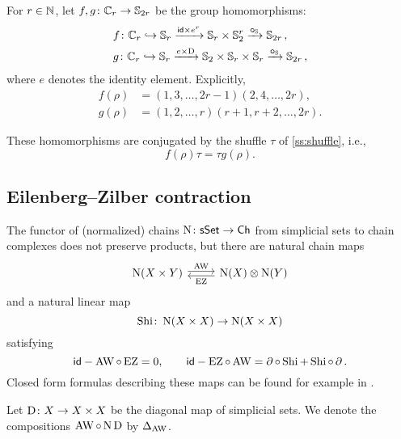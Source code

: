 For $r \in \mathbb{N}$, let $f,g \colon \mathbb{C}_r \to \mathbb{S}_{2r}$ be the group homomorphisms:
\[
\begin{split}
	&f \colon \mathbb{C}_r \hookrightarrow \mathbb{S}_r \xrightarrow{\mathsf{id} \times e^r} \mathbb{S}_r \times \mathbb{S}_2^r \xrightarrow{\bm{\circ}_{\mathbb{S}}} \mathbb{S}_{2r}\,, \\
	&g \colon \mathbb{C}_r \hookrightarrow \mathbb{S}_r \xrightarrow{e \times \mathrm{D}} \mathbb{S}_2 \times \mathbb{S}_r \times \mathbb{S}_r \xrightarrow{\bm{\circ}_{\mathbb{S}}} \mathbb{S}_{2r}\,,
\end{split}
\]
where $e$ denotes the identity element.
Explicitly,
\begin{align*}
	f(\rho) &= (1,3,\dots,2r-1)(2,4,\dots,2r), \\
	g(\rho) &= (1,2,\dots,r)(r+1,r+2,\dots,2r).
\end{align*}

\begin{lemma}
	These homomorphisms are conjugated by the shuffle $\tau$ of \cref{ss:shuffle}, i.e.,
	\[
	f(\rho) \tau = \tau g(\rho).
	\]
\end{lemma}

\subsection{Eilenberg--Zilber contraction}

The functor of (normalized) chains $\operatorname{N} \colon \mathsf{sSet} \to \mathsf{Ch}$ from simplicial sets to chain complexes does not preserve products, but there are natural chain maps
\[
\begin{tikzcd}
	\chains(X \times Y) \arrow[r,shift left=2pt,"\AW"] &
	\chains(X) \ot \chains(Y) \arrow[l,shift left=2pt,"\EZ"]
\end{tikzcd}
\]
and a natural linear map
\[
\operatorname{Shi} \colon \operatorname{N}(X \times X) \to \operatorname{N}(X \times X)
\]
satisfying
\[
\mathsf{id} - \operatorname{AW} \circ \operatorname{EZ} = 0, \qquad
\mathsf{id} - \operatorname{EZ} \circ \operatorname{AW} = \operatorname{\partial} \circ \operatorname{Shi} + \operatorname{Shi} \circ \operatorname{\partial}.
\]
Closed form formulas describing these maps can be found for example in \cite[56]{real2000homological}.

Let $\mathrm{D} \colon X \to X \times X$ be the diagonal map of simplicial sets.
We denote the compositions $\operatorname{AW} \circ \operatorname{N}\mathrm{D}$ by $\Delta_{\operatorname{AW}}$.